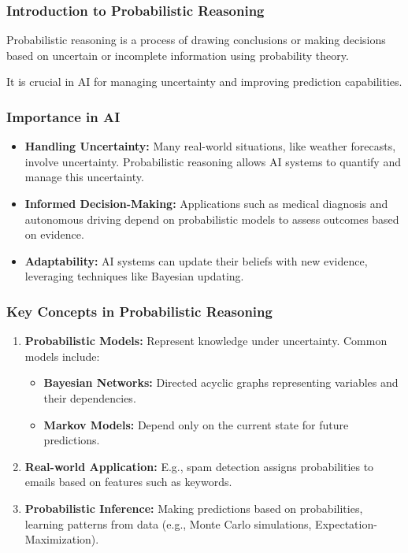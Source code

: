 \documentclass[aspectratio=169]{beamer}
\begin{document}
\frame{\titlepage}

\begin{frame}[fragile]
    \frametitle{Introduction to Probabilistic Reasoning}
    Probabilistic reasoning is a process of drawing conclusions or making decisions based on uncertain or incomplete information using probability theory.
    
    It is crucial in AI for managing uncertainty and improving prediction capabilities.
\end{frame}

\begin{frame}[fragile]
    \frametitle{Importance in AI}
    \begin{itemize}
        \item \textbf{Handling Uncertainty:} 
        Many real-world situations, like weather forecasts, involve uncertainty. Probabilistic reasoning allows AI systems to quantify and manage this uncertainty.
        
        \item \textbf{Informed Decision-Making:} 
        Applications such as medical diagnosis and autonomous driving depend on probabilistic models to assess outcomes based on evidence.
        
        \item \textbf{Adaptability:} 
        AI systems can update their beliefs with new evidence, leveraging techniques like Bayesian updating.
    \end{itemize}
\end{frame}

\begin{frame}[fragile]
    \frametitle{Key Concepts in Probabilistic Reasoning}
    \begin{enumerate}
        \item \textbf{Probabilistic Models:}
        Represent knowledge under uncertainty. Common models include:
            \begin{itemize}
                \item \textbf{Bayesian Networks:} 
                Directed acyclic graphs representing variables and their dependencies.
                \item \textbf{Markov Models:} 
                Depend only on the current state for future predictions.
            \end{itemize}

        \item \textbf{Real-world Application:} 
        E.g., spam detection assigns probabilities to emails based on features such as keywords.

        \item \textbf{Probabilistic Inference:} 
        Making predictions based on probabilities, learning patterns from data (e.g., Monte Carlo simulations, Expectation-Maximization).
    \end{enumerate}
\end{frame}
\end{document}
